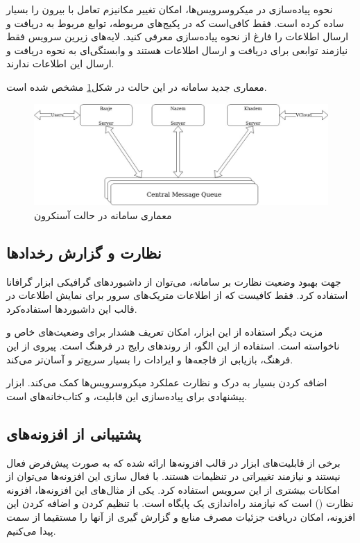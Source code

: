نحوه پیاده‌سازی  در میکروسرویس‌ها، امکان تغییر مکانیزم تعامل با بیرون را بسیار ساده کرده است. فقط کافی‌است که در پکیج‌های مربوطه، توابع مربوط به دریافت و ارسال اطلاعات را فارغ از نحوه پیاده‌سازی معرفی کنید. لایه‌های زیرین سرویس فقط نیازمند توابعی برای دریافت و ارسال اطلاعات هستند و وابستگی‌ای به نحوه دریافت و ارسال این اطلاعات ندارند.

معماری جدید سامانه در این حالت در شکل\ref{fig:30bird-cmq} مشخص شده است.

\begin{figure}
	\centering
	\includegraphics[scale=0.45]{figures/30bird-cmq.jpg}
	\caption{معماری سامانه در حالت آسنکرون}
	\label{fig:30bird-cmq}
\end{figure}


\subsection{نظارت و گزارش رخداد‌ها}
جهت بهبود وضعیت نظارت بر سامانه، می‌توان از داشبورد‌های گرافیکی ابزار گرافانا استفاده کرد. فقط کافیست که از اطلاعات متریک‌های سرور برای نمایش اطلاعات در قالب این داشبورد‌ها استفاده‌کرد.

مزیت دیگر استفاده از این ابزار، امکان تعریف هشدار برای وضعیت‌های خاص و ناخواسته است. استفاده از این الگو، از روند‌های رایج در فرهنگ  است. پیروی از این فرهنگ، بازیابی از فاجعه‌ها و ایرادات را بسیار سریع‌تر و آسان‌تر می‌کند.

اضافه کردن  بسیار به درک و نظارت عملکرد میکروسرویس‌ها کمک می‌کند. ابزار پیشنهادی برای پیاده‌سازی این قابلیت،  و کتاب‌خانه‌های  است.

\subsection{پشتیبانی از افزونه‌های }
برخی از قابلیت‌های ابزار  در قالب افزونه‌ها ارائه شده که به صورت پیش‌فرض فعال نیستند و نیازمند تغییراتی در تنظیمات هستند. با فعال سازی این افزونه‌ها می‌توان از امکانات بیشتری از این سرویس استفاده کرد. یکی از مثال‌های این افزونه‌ها، افزونه نظارت () است که نیازمند راه‌اندازی یک پایگاه  است. با تنظیم کردن و اضافه کردن این افزونه، امکان دریافت جزئیات مصرف منابع و گزارش گیری از آنها را مستقیما از سمت  پیدا می‌کنیم.

